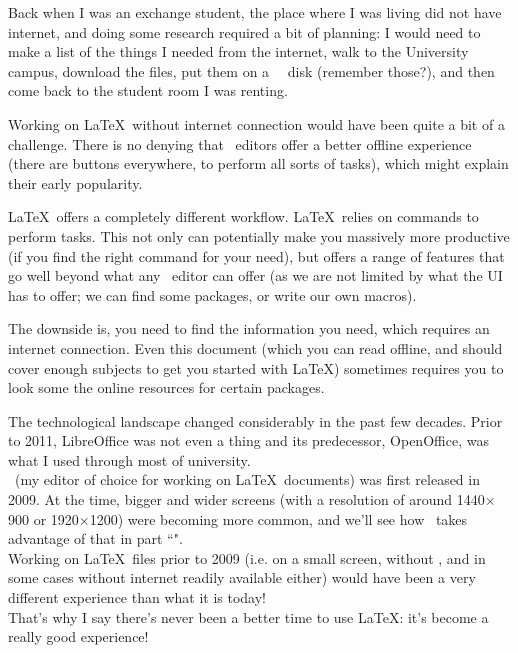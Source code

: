 \begin{description}
	Back when I was an exchange student, the place where I was living did not have internet, and doing some research required a bit of planning: I would need to make a list of the things I needed from the internet, walk to the University campus, download the files, put them on a \Iomega\ \Zip\ disk (remember those?), and then come back to the student room I was renting.
	
	Working on \LaTeX\ without internet connection would have been quite a bit of a challenge. There is no denying that \WYSIWYG\ editors offer a better offline experience (there are buttons everywhere, to perform all sorts of tasks), which might explain their early popularity.
	
	\LaTeX\ offers a completely different workflow. \LaTeX\ relies on commands to perform tasks. This not only can potentially make you massively more productive (if you find the right command for your need), but offers a range of features that go well beyond what any \WYSIWYG\ editor can offer (as we are not limited by what the UI has to offer; we can find some packages, or write our own macros). 
	
	The downside is, you need to find the information you need, which requires an internet connection. Even this document (which you can read offline, and should cover enough subjects to get you started with \LaTeX) sometimes requires you to look some the online resources for certain packages.
\end{description}

The technological landscape changed considerably in the past few decades. Prior to 2011, LibreOffice was not even a thing and its predecessor, OpenOffice, was what I used through most of university. \\

\TeXstudio\ (my editor of choice for working on \LaTeX\ documents) was first released in 2009. At the time, bigger and wider screens (with a resolution of around 1440$\times$900 or 1920$\times$1200) were becoming more common, and we'll see how \TeXstudio\ takes advantage of that in part ``". \\

Working on \LaTeX\ files prior to 2009 (i.e. on a small screen, without \TeXstudio, and in some cases without internet readily available either) would have been a very different experience than what it is today! \\

That's why I say there's never been a better time to use \LaTeX: it's become a really good experience! \\


